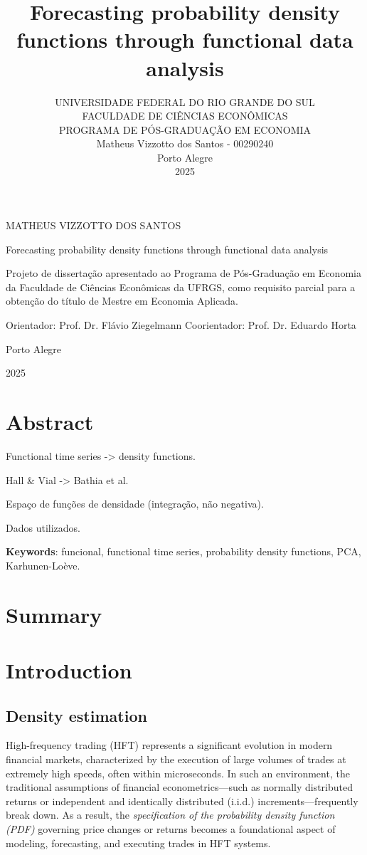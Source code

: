 \documentclass[article]{abntex2}
\title{Forecasting probability density functions through functional data analysis}
\author{UNIVERSIDADE FEDERAL DO RIO GRANDE DO SUL\\ FACULDADE DE CIÊNCIAS ECONÔMICAS \\ PROGRAMA DE PÓS-GRADUAÇÃO EM ECONOMIA \\ Matheus Vizzotto dos Santos - 00290240 \\ Porto Alegre \\ 2025}
\begin{document}
\pagestyle{headings}

\maketitle

\newpage
\newpage
MATHEUS VIZZOTTO DOS SANTOS

Forecasting probability density functions through functional data analysis

Projeto de dissertação apresentado ao Programa de Pós-Graduação em Economia da Faculdade de Ciências Econômicas da UFRGS, como requisito parcial para a obtenção do título de Mestre em Economia Aplicada.

Orientador: Prof. Dr. Flávio Ziegelmann
Coorientador: Prof. Dr. Eduardo Horta

Porto Alegre

2025

\newpage

\section{Abstract}
Functional time series -> density functions.

Hall \& Vial -> Bathia et al.

Espaço de funções de densidade (integração, não negativa).

Dados utilizados.

\textbf{Keywords}: funcional, functional time series, probability density functions, PCA, Karhunen-Loève.

\newpage

\section{Summary}

\newpage

\section{Introduction}
\subsection{Density estimation}
High-frequency trading (HFT) represents a significant evolution in modern financial markets, characterized by the execution of large volumes of trades at extremely high speeds, often within microseconds. In such an environment, the traditional assumptions of financial econometrics—such as normally distributed returns or independent and identically distributed (i.i.d.) increments—frequently break down. As a result, the \textit{specification of the probability density function (PDF)} governing price changes or returns becomes a foundational aspect of modeling, forecasting, and executing trades in HFT systems.
\end{document}
